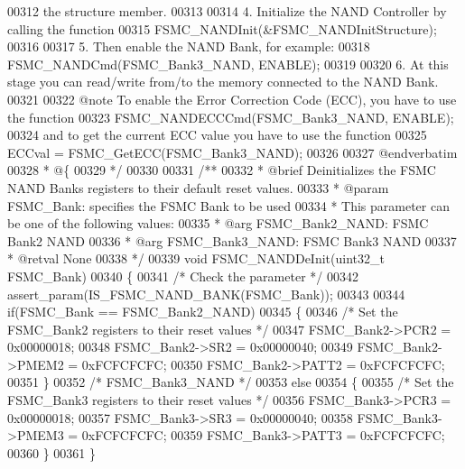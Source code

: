 \begin{DoxyCode}
00312 \textcolor{comment}{      the structure member.}
00313 \textcolor{comment}{      }
00314 \textcolor{comment}{   4. Initialize the NAND Controller by calling the function}
00315 \textcolor{comment}{          FSMC\_NANDInit(&FSMC\_NANDInitStructure); }
00316 \textcolor{comment}{}
00317 \textcolor{comment}{   5. Then enable the NAND Bank, for example:}
00318 \textcolor{comment}{          FSMC\_NANDCmd(FSMC\_Bank3\_NAND, ENABLE);  }
00319 \textcolor{comment}{}
00320 \textcolor{comment}{   6. At this stage you can read/write from/to the memory connected to the NAND Bank. }
00321 \textcolor{comment}{   }
00322 \textcolor{comment}{@note To enable the Error Correction Code (ECC), you have to use the function}
00323 \textcolor{comment}{          FSMC\_NANDECCCmd(FSMC\_Bank3\_NAND, ENABLE);  }
00324 \textcolor{comment}{      and to get the current ECC value you have to use the function}
00325 \textcolor{comment}{          ECCval = FSMC\_GetECC(FSMC\_Bank3\_NAND); }
00326 \textcolor{comment}{}
00327 \textcolor{comment}{@endverbatim}
00328 \textcolor{comment}{  * @\{}
00329 \textcolor{comment}{  */}
00330 
00331 \textcolor{comment}{/**}
00332 \textcolor{comment}{  * @brief  Deinitializes the FSMC NAND Banks registers to their default reset values.}
00333 \textcolor{comment}{  * @param  FSMC\_Bank: specifies the FSMC Bank to be used}
00334 \textcolor{comment}{  *          This parameter can be one of the following values:}
00335 \textcolor{comment}{  *            @arg FSMC\_Bank2\_NAND: FSMC Bank2 NAND }
00336 \textcolor{comment}{  *            @arg FSMC\_Bank3\_NAND: FSMC Bank3 NAND }
00337 \textcolor{comment}{  * @retval None}
00338 \textcolor{comment}{  */}
00339 \textcolor{keywordtype}{void} FSMC_NANDDeInit(uint32\_t FSMC\_Bank)
00340 \{
00341   \textcolor{comment}{/* Check the parameter */}
00342   assert_param(IS\_FSMC\_NAND\_BANK(FSMC\_Bank));
00343 
00344   \textcolor{keywordflow}{if}(FSMC\_Bank == FSMC_Bank2_NAND)
00345   \{
00346     \textcolor{comment}{/* Set the FSMC\_Bank2 registers to their reset values */}
00347     FSMC_Bank2->PCR2 = 0x00000018;
00348     FSMC_Bank2->SR2 = 0x00000040;
00349     FSMC_Bank2->PMEM2 = 0xFCFCFCFC;
00350     FSMC_Bank2->PATT2 = 0xFCFCFCFC;
00351   \}
00352   \textcolor{comment}{/* FSMC\_Bank3\_NAND */}
00353   \textcolor{keywordflow}{else}
00354   \{
00355     \textcolor{comment}{/* Set the FSMC\_Bank3 registers to their reset values */}
00356     FSMC_Bank3->PCR3 = 0x00000018;
00357     FSMC_Bank3->SR3 = 0x00000040;
00358     FSMC_Bank3->PMEM3 = 0xFCFCFCFC;
00359     FSMC_Bank3->PATT3 = 0xFCFCFCFC;
00360   \}
00361 \}

\end{DoxyCode}
